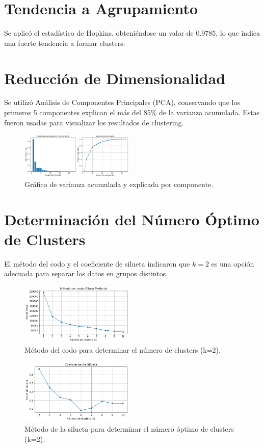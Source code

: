 \documentclass[conference]{IEEEtran}
\begin{document}
\section{Tendencia a Agrupamiento}
Se aplicó el estadístico de Hopkins, obteniéndose un valor de $0.9785$, lo que indica una fuerte tendencia a formar clusters.
\section{Reducción de Dimensionalidad}
Se utilizó Análisis de Componentes Principales (PCA), conservando que los primeros 5 componentes explican el más del 85\% de la varianza acumulada. Estas fueron usadas para visualizar los resultados de clustering.
\begin{figure}[H]
    \centering
    \includegraphics[width=0.48\textwidth]{images/varianza_acumulada.png}
    \caption{Gráfico de varianza acumulada y explicada por componente.}
    \label{fig:pca}
\end{figure}

\section{Determinación del Número Óptimo de Clusters}
El método del codo y el coeficiente de silueta indicaron que $k=2$ es una opción adecuada para separar los datos en grupos distintos.

\begin{figure}[H]
    \centering
    \includegraphics[width=0.48\textwidth]{images/elbow.png}
    \caption{Método del codo para determinar el número de clusters (k=2).}
    \label{fig:elbow}
\end{figure}

\begin{figure}[H]
    \centering
    \includegraphics[width=0.48\textwidth]{images/silueta.png}
    \caption{Método de la silueta para determinar el número óptimo de clusters (k=2).}
    \label{fig:silueta}
\end{figure}
\end{document}
